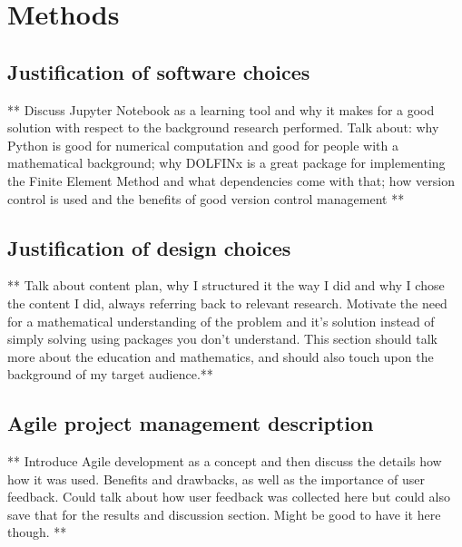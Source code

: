 \chapter{Methods}
\label{chapter2}


\section{Justification of software choices}
** Discuss Jupyter Notebook as a learning tool and why it makes for a good solution with respect to the background research performed. Talk about: why Python is good for numerical computation and good for people with a mathematical background; why DOLFINx is a great package for implementing the Finite Element Method and what dependencies come with that; how version control is used and the benefits of good version control management **

\section{Justification of design choices}
** Talk about content plan, why I structured it the way I did and why I chose the content I did, always referring back to relevant research. Motivate the need for a mathematical understanding of the problem and it's solution instead of simply solving using packages you don't understand. This section should talk more about the education and mathematics, and should also touch upon the background of my target audience.**

\section{Agile project management description}
** Introduce Agile development as a concept and then discuss the details how how it was used. Benefits and drawbacks, as well as the importance of user feedback. Could talk about how user feedback was collected here but could also save that for the results and discussion section. Might be good to have it here though. **
